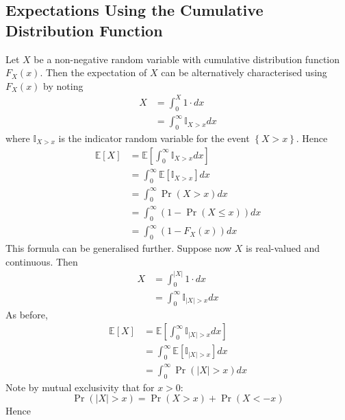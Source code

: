 \documentclass[11pt]{report} %
\begin{document}
\subsection{Expectations Using the Cumulative Distribution Function}

Let $X$ be a non-negative random variable with cumulative distribution function $F_{X}\left(x\right)$. Then the expectation of $X$ can be alternatively characterised using $F_{X}\left(x\right)$ by noting
\begin{align}
X &= \int_{0}^{X}1\cdot dx \\
&= \int_{0}^{\infty}\mathbb{I}_{X > x} dx
\end{align}
where $\mathbb{I}_{X > x}$ is the indicator random variable for the event $\left\{X > x\right\}$. Hence
\begin{align}
\mathbb{E}\left[X\right] &= \mathbb{E}\left[\int_{0}^{\infty}\mathbb{I}_{X > x} dx\right] \\
&= \int_{0}^{\infty}\mathbb{E}\left[\mathbb{I}_{X > x}\right] dx \\
&= \int_{0}^{\infty}\operatorname{Pr}\left(X > x\right) dx\\
&= \int_{0}^{\infty}\left(1 - \operatorname{Pr}\left(X \leq x\right)\right) dx \\
&= \int_{0}^{\infty}\left(1 - F_{X}\left(x\right)\right) dx
\end{align}
This formula can be generalised further. Suppose now $X$ is real-valued and continuous. Then
\begin{align}
X &= \int_{0}^{\left|X\right|}1\cdot dx \\
&= \int_{0}^{\infty}\mathbb{I}_{\left|X\right| > x} dx
\end{align}
As before,
\begin{align}
\mathbb{E}\left[X\right] &= \mathbb{E}\left[\int_{0}^{\infty}\mathbb{I}_{\left|X\right| > x} dx\right] \\
&= \int_{0}^{\infty}\mathbb{E}\left[\mathbb{I}_{\left|X\right| > x}\right] dx \\
&= \int_{0}^{\infty}\operatorname{Pr}\left(\left|X\right| > x\right) dx
\end{align}
Note by mutual exclusivity that for $x > 0$:
\begin{equation}
\operatorname{Pr}\left(\left|X\right| > x\right) = \operatorname{Pr}\left(X > x\right) + \operatorname{Pr}\left(X < -x\right)
\end{equation}
Hence
\end{document}
